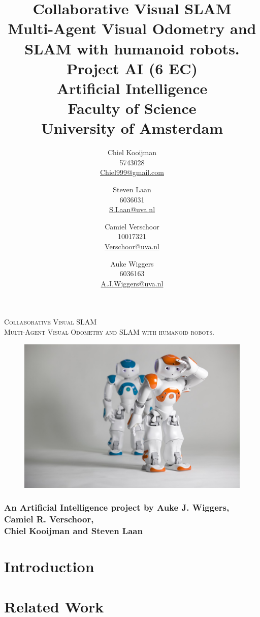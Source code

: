 \documentclass[a4paper]{article}
\author{Chiel Kooijman\\5743028\\\url{Chiel999@gmail.com} \and
Steven Laan\\6036031\\\url{S.Laan@uva.nl} \and
Camiel Verschoor\\10017321\\\url{Verschoor@uva.nl} \and
Auke Wiggers\\6036163\\\url{A.J.Wiggers@uva.nl}}
\title{Collaborative Visual SLAM\\\normalsize Multi-Agent Visual Odometry and SLAM with humanoid robots.\\Project AI (6 EC)\\Artificial Intelligence\\Faculty of Science\\University of Amsterdam}
\begin{document}
\thispagestyle{empty}
\begin{center}
\Large\textsc{Collaborative Visual SLAM}\\
\normalsize\textsc{Multi-Agent Visual Odometry and SLAM with humanoid robots.}

\vspace{2cm}

\begin{figure}[!ht]
\centering
\includegraphics[width=\textwidth]{images/front.jpg}
\end{figure}

\subsubsection*{An Artificial Intelligence project by Auke J. Wiggers, Camiel R. Verschoor,\\Chiel Kooijman and Steven Laan}
\end{center}

\newpage

\thispagestyle{empty}
\mbox{}
\newpage

\maketitle
\clearpage

\thispagestyle{empty}
\tableofcontents
\clearpage

\section{Introduction}

\section{Related Work}
\end{document}
